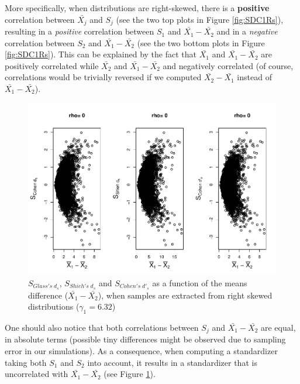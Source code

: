 \documentclass[
  man]{apa6}
\begin{document}
More specifically, when distributions are right-skewed, there is a \textbf{positive} correlation between \(\bar{X_j}\) and \(S_j\) (see the two top plots in Figure \ref{fig:SDC1Rs}), resulting in a \emph{positive} correlation between \(S_1\) and \(\bar{X_1}-\bar{X_2}\) and in a \emph{negative} correlation between \(S_2\) and \(\bar{X_1}-\bar{X_2}\) (see the two bottom plots in Figure \ref{fig:SDC1Rs}). This can be explained by the fact that \(\bar{X_1}\) and \(\bar{X_1}-\bar{X_2}\) are positively correlated while \(\bar{X_2}\) and \(\bar{X_1}-\bar{X_2}\) and negatively correlated (of course, correlations would be trivially reversed if we computed \(\bar{X_2}-\bar{X_1}\) instead of \(\bar{X_1}-\bar{X_2}\)).

\begin{figure}
\centering
\includegraphics{Correlations-between-the-sample-means-difference-and-standardizers-of-all-estimators,-and-implications-on-biases-and-variances-of-all-estimators_files/figure-latex/StdzrC1Rs-1.pdf}
\caption{\label{fig:StdzrC1Rs}\(S_{Glass's \; d_s}\), \(S_{Shieh's \; d_s}\) and \(S_{Cohen's \; d'_s}\) as a function of the means difference (\(\bar{X_1}-\bar{X_2}\)), when samples are extracted from right skewed distributions (\(\gamma_1 = 6.32\))}
\end{figure}

One should also notice that both correlations between \(S_j\) and \(\bar{X_1}-\bar{X_2}\) are equal, in absolute terms (possible tiny differences might be observed due to sampling error in our simulations). As a consequence, when computing a standardizer taking both \(S_1\) and \(S_2\) into account, it results in a standardizer that is uncorrelated with \(\bar{X_1}-\bar{X_2}\) (see Figure \ref{fig:StdzrC1Rs}).
\end{document}
